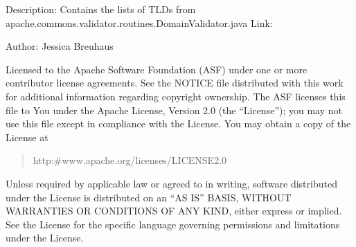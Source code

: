 \documentclass[letterpaper,10pt,english]{sphinxmanual}
\begin{document}
\sphinxAtStartPar
Description: Contains the lists of TLDs from apache.commons.validator.routines.DomainValidator.java
Link: 

\sphinxAtStartPar
Author: Jessica Breuhaus
\begin{description}
\sphinxAtStartPar
Licensed to the Apache Software Foundation (ASF) under one or more
contributor license agreements.  See the NOTICE file distributed with
this work for additional information regarding copyright ownership.
The ASF licenses this file to You under the Apache License, Version 2.0
(the “License”); you may not use this file except in compliance with
the License.  You may obtain a copy of the License at
\begin{quote}

\sphinxAtStartPar
http:\#www.apache.org/licenses/LICENSE\sphinxhyphen{}2.0
\end{quote}

\sphinxAtStartPar
Unless required by applicable law or agreed to in writing, software
distributed under the License is distributed on an “AS IS” BASIS,
WITHOUT WARRANTIES OR CONDITIONS OF ANY KIND, either express or implied.
See the License for the specific language governing permissions and
limitations under the License.

\end{description}
\end{document}
